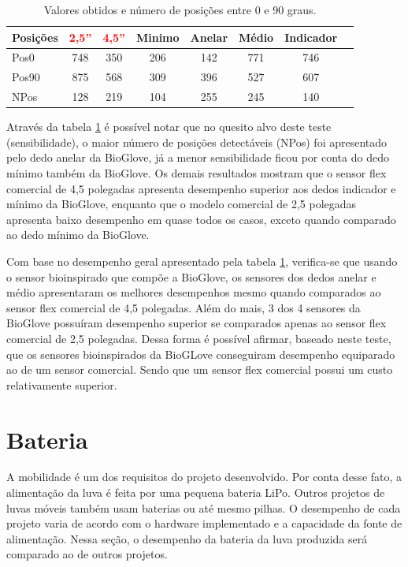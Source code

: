 \documentclass[
	12pt,				%
	openright,			%
	oneside,			%
	a4paper,			%
	english,			%
	brazil				%
	]{abntex2}
\begin{document}
		\begin{table}[H]
  	\centering
		\caption{Valores obtidos e número de posições entre 0 e 90 graus.}
    \begin{tabular}{l|ccccccc}
      \midrule
			Posições&\textcolor{red}{2,5''}	&\textcolor{red}{4,5''}	& Minimo	& Anelar	& Médio	&	Indicador	\\
      \midrule
			Pos0 		& 748 									& 350 									& 206 		&	142			&	771		&	746				\\
			Pos90 	& 875 									& 568 									& 309 		&	396			&	527		&	607				\\
			NPos 		& 128 									& 219 									& 104 		&	255			&	245		&	140				\\
      \midrule
    \end{tabular}
		\label{Tab:NPos0-90}
		\end{table}

		Através da tabela \ref{Tab:NPos0-90} é possível notar que no quesito alvo deste teste (sensibilidade), o maior número de posições detectáveis (NPos) foi apresentado pelo dedo anelar da BioGlove, já a menor sensibilidade ficou por conta do dedo mínimo também da BioGlove. Os demais resultados mostram que o sensor flex comercial de 4,5 polegadas apresenta desempenho superior aos dedos indicador e mínimo da BioGlove, enquanto que o modelo comercial de 2,5 polegadas apresenta baixo desempenho em quase todos os casos, exceto quando comparado ao dedo mínimo da BioGlove.

		Com base no desempenho geral apresentado pela tabela \ref{Tab:NPos0-90}, verifica-se que usando o sensor bioinspirado que compõe a BioGlove, os sensores dos dedos anelar e médio apresentaram os melhores desempenhos mesmo quando comparados ao sensor flex comercial de 4,5 polegadas. Além do mais, 3 dos 4 sensores da BioGlove possuíram desempenho superior se comparados apenas ao sensor flex comercial de 2,5 polegadas. Dessa forma é possível afirmar, baseado neste teste, que os sensores bioinspirados da BioGLove conseguiram desempenho equiparado ao de um sensor comercial. Sendo que um sensor flex comercial possui um custo relativamente superior.


			\section{Bateria}

			A mobilidade é um dos requisitos do projeto desenvolvido. Por conta desse fato, a alimentação da luva é feita por uma pequena bateria LiPo. Outros projetos de luvas móveis também usam baterias ou até mesmo pilhas. O desempenho de cada projeto varia de acordo com o hardware implementado e a capacidade da fonte de alimentação. Nessa seção, o desempenho da bateria da luva produzida será comparado ao de outros projetos.
\end{document}
